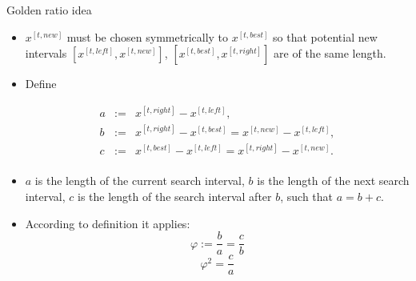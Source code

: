 \documentclass[11pt,compress,t,notes=noshow, xcolor=table]{beamer}
\begin{document}
\begin{vbframe}{Golden ratio idea}
\begin{itemize}








\item $x^{[t, new]}$ must be chosen symmetrically to $x^{[t, best]}$ so that potential new intervals $[x^{[t, left]}, x^{[t, new]}]$, $[x^{[t, best]}, x^{[t, right]}]$  are of the same length.
\item Define
\vspace*{-0.3cm}
\begin{footnotesize}
\begin{eqnarray*}
a &:=& x^{[t, right]}-x^{[t, left]}, \\
b &:=& x^{[t, right]}-x^{[t, best]} = x^{[t, new]}-x^{[t, left]},\\
c &:=& x^{[t, best]}-x^{[t, left]} = x^{[t, right]}-x^{[t, new]}.\\
\end{eqnarray*}
\end{footnotesize}
\item $a$ is the length of the current search interval, $b$ is the length of the next search interval, $c$ is the length of the search interval after $b$, such that $a = b + c$.
\item According to definition it applies:
$$
\varphi := \frac{b}{a} = \frac{c}{b}
$$
$$
\varphi^2 = \frac{c}{a}
$$


\end{itemize}
\end{vbframe}
\end{document}
